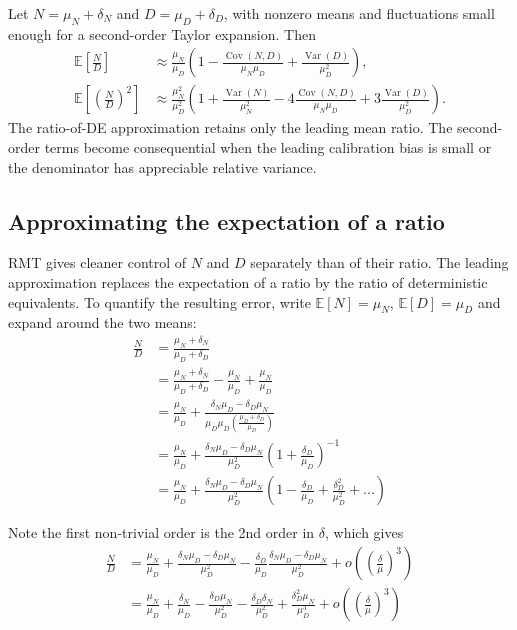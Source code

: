 \begingroup\color{red}
\begin{proposition}
\label{prop:app-ratio-delta}
Let $N=\mu_N+\delta_N$ and $D=\mu_D+\delta_D$, with nonzero means and
fluctuations small enough for a second-order Taylor expansion. Then
\begin{align}
\mathbb E\!\left[\frac ND\right]
&\approx\frac{\mu_N}{\mu_D}
\left(1-\frac{\operatorname{Cov}(N,D)}{\mu_N\mu_D}
+\frac{\operatorname{Var}(D)}{\mu_D^2}\right),\\
\mathbb E\!\left[\left(\frac ND\right)^2\right]
&\approx\frac{\mu_N^2}{\mu_D^2}
\left(1+\frac{\operatorname{Var}(N)}{\mu_N^2}
-4\frac{\operatorname{Cov}(N,D)}{\mu_N\mu_D}
+3\frac{\operatorname{Var}(D)}{\mu_D^2}\right).
\end{align}
The ratio-of-DE approximation retains only the leading mean ratio.  The
second-order terms become consequential when the leading calibration bias is
small or the denominator has appreciable relative variance.
\end{proposition}
\endgroup

\subsection{Approximating the expectation of a ratio}

RMT gives cleaner control of $N$ and $D$ separately than of their ratio.
The leading approximation replaces the expectation of a ratio by the ratio
of deterministic equivalents. To quantify the resulting error, write
$\mathbb{E}[N]=\mu_N$, $\mathbb{E}[D]=\mu_D$ and expand around the two means:
\begin{align*}
\frac{N}{D} & =\frac{\mu_{N}+\delta_{N}}{\mu_{D}+\delta_{D}}\\
 & =\frac{\mu_{N}+\delta_{N}}{\mu_{D}+\delta_{D}}-\frac{\mu_{N}}{\mu_{D}}+\frac{\mu_{N}}{\mu_{D}}\\
 & =\frac{\mu_{N}}{\mu_{D}}+\frac{\delta_{N}\mu_{D}-\delta_{D}\mu_{N}}{\mu_{D}\mu_{D}(\frac{\mu_{D}+\delta_{D}}{\mu_{D}})}\\
 & =\frac{\mu_{N}}{\mu_{D}}+\frac{\delta_{N}\mu_{D}-\delta_{D}\mu_{N}}{\mu_{D}^{2}}(1+\frac{\delta_{D}}{\mu_{D}})^{-1}\\
 & =\frac{\mu_{N}}{\mu_{D}}+\frac{\delta_{N}\mu_{D}-\delta_{D}\mu_{N}}{\mu_{D}^{2}}(1-\frac{\delta_{D}}{\mu_{D}}+\frac{\delta_{D}^{2}}{\mu_{D}^{2}}+...)
\end{align*}

Note the first non-trivial order is the 2nd order in $\delta$, which
gives
\begin{align*}
\frac{N}{D} & =\frac{\mu_{N}}{\mu_{D}}+\frac{\delta_{N}\mu_{D}-\delta_{D}\mu_{N}}{\mu_{D}^{2}}-\frac{\delta_{D}}{\mu_{D}}\frac{\delta_{N}\mu_{D}-\delta_{D}\mu_{N}}{\mu_{D}^{2}}+o((\frac{\delta}{\mu})^{3})\\
 & =\frac{\mu_{N}}{\mu_{D}}+\frac{\delta_{N}}{\mu_{D}}-\frac{\delta_{D}\mu_{N}}{\mu_{D}^{2}}-\frac{\delta_{D}\delta_{N}}{\mu_{D}^{2}}+\frac{\delta_{D}^{2}\mu_{N}}{\mu_{D}^{3}}+o((\frac{\delta}{\mu})^{3})
\end{align*}

